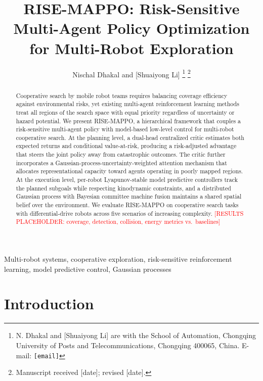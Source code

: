 \documentclass[letterpaper]{IEEEtran}
\begin{document}
\title{RISE-MAPPO: Risk-Sensitive Multi-Agent Policy Optimization for Multi-Robot Exploration}

\author{Nischal Dhakal and [Shuaiyong Li]%
\thanks{N. Dhakal and [Shuaiyong Li] are with the School of Automation, Chongqing University of Posts and Telecommunications, Chongqing 400065, China. E-mail: \texttt{[email]}}%
\thanks{Manuscript received [date]; revised [date].}}

\maketitle

\begin{abstract}
Cooperative search by mobile robot teams requires balancing coverage efficiency against environmental risks, yet existing multi-agent reinforcement learning methods treat all regions of the search space with equal priority regardless of uncertainty or hazard potential. We present RISE-MAPPO, a hierarchical framework that couples a risk-sensitive multi-agent policy with model-based low-level control for multi-robot cooperative search. At the planning level, a dual-head centralized critic estimates both expected returns and conditional value-at-risk, producing a risk-adjusted advantage that steers the joint policy away from catastrophic outcomes. The critic further incorporates a Gaussian-process-uncertainty-weighted attention mechanism that allocates representational capacity toward agents operating in poorly mapped regions. At the execution level, per-robot Lyapunov-stable model predictive controllers track the planned subgoals while respecting kinodynamic constraints, and a distributed Gaussian process with Bayesian committee machine fusion maintains a shared spatial belief over the environment. We evaluate RISE-MAPPO on cooperative search tasks with differential-drive robots across five scenarios of increasing complexity. \textcolor{red}{[RESULTS PLACEHOLDER: coverage, detection, collision, energy metrics vs.\ baselines]}
\end{abstract}

\begin{IEEEkeywords}
Multi-robot systems, cooperative exploration, risk-sensitive reinforcement learning, model predictive control, Gaussian processes
\end{IEEEkeywords}

\section{Introduction}
\label{sec:intro}
\end{document}
